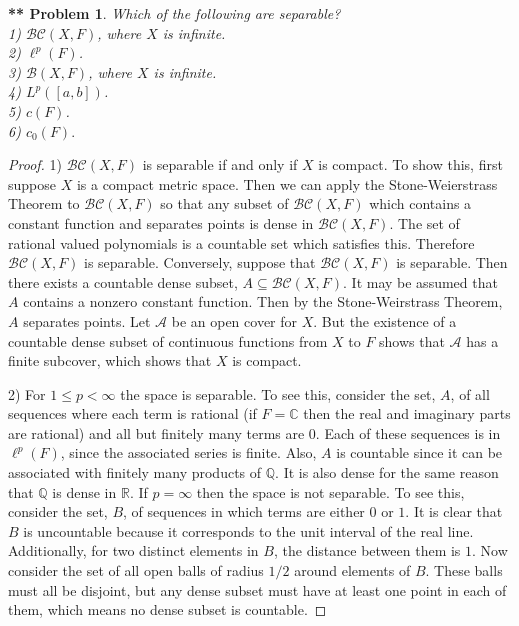 \documentclass{article}
\newtheorem{**}{** Problem}
\begin{document}
\begin{flushleft}
\begin{**}
Which of the following are separable?\\
1) $\mathcal{BC}(X, F)$, where $X$ is infinite.\\
2) $\ell^p(F)$.\\
3) $\mathcal{B}(X, F)$, where $X$ is infinite.\\
4) $L^p([a,b])$.\\
5) $c(F)$.\\
6) $c_0(F).$
\end{**}
\begin{proof}
1) $\mathcal{BC}(X, F)$ is separable if and only if $X$ is compact. To show this, first suppose $X$ is a compact metric space. Then we can apply the Stone-Weierstrass Theorem to $\mathcal{BC}(X, F)$ so that any subset of $\mathcal{BC}(X, F)$ which contains a constant function and separates points is dense in $\mathcal{BC}(X, F)$. The set of rational valued polynomials is a countable set which satisfies this. Therefore $\mathcal{BC}(X, F)$ is separable. Conversely, suppose that $\mathcal{BC}(X, F)$ is separable. Then there exists a countable dense subset, $A \subseteq \mathcal{BC}(X, F)$. It may be assumed that $A$ contains a nonzero constant function. Then by the Stone-Weirstrass Theorem, $A$ separates points. Let $\mathcal{A}$ be an open cover for $X$. But the existence of a countable dense subset of continuous functions from $X$ to $F$ shows that $\mathcal{A}$ has a finite subcover, which shows that $X$ is compact.\newline

2) For $1 \leq p < \infty$ the space is separable. To see this, consider the set, $A$, of all sequences where each term is rational (if $F = \mathbb{C}$ then the real and imaginary parts are rational) and all but finitely many terms are $0$. Each of these sequences is in $\ell^p(F)$, since the associated series is finite. Also, $A$ is countable since it can be associated with finitely many products of $\mathbb{Q}$. It is also dense for the same reason that $\mathbb{Q}$ is dense in $\mathbb{R}$. If $p = \infty$ then the space is not separable. To see this, consider the set, $B$, of sequences in which terms are either $0$ or $1$. It is clear that $B$ is uncountable because it corresponds to the unit interval of the real line. Additionally, for two distinct elements in $B$, the distance between them is $1$. Now consider the set of all open balls of radius $1/2$ around elements of $B$. These balls must all be disjoint, but any dense subset must have at least one point in each of them, which means no dense subset is countable.\newline


\end{proof}
\end{flushleft}
\end{document}

